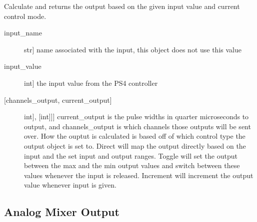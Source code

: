 \documentclass[letterpaper,10pt,english]{sphinxmanual}
\begin{document}
\begin{fulllineitems}
\begin{description}
\end{description}

\begin{fulllineitems}
\label{\detokenize{generic:AnalogOutputObject.AnalogOutputObject.get_output}}
\sphinxAtStartPar
Calculate and returns the output based on the given input value and current control mode.
\begin{description}
\item[{input\_name}] \leavevmode{[}str{]}
\sphinxAtStartPar
name associated with the input, this object does not use this value

\item[{input\_value}] \leavevmode{[}int{]}
\sphinxAtStartPar
the input value from the PS4 controller

\end{description}
\begin{description}
\item[{{[}channels\_output, current\_output{]}}] \leavevmode{[}{[}{[}int{]}, {[}int{]}{]}{]}
\sphinxAtStartPar
current\_output is the pulse widths in quarter microseconds to output, and channels\_output
is which channels those outputs will be sent over. How the ouptut is calculated is based
off of which control type the output object is set to. Direct will map the output directly
based on the input and the set input and output ranges. Toggle will set the output between
the max and the min output values and switch between these values whenever the input is
released. Increment will increment the output value whenever input is given.

\end{description}

\end{fulllineitems}


\end{fulllineitems}



\subsection{Analog Mixer Output}
\label{\detokenize{generic:module-AnalogMixerOutput}}\label{\detokenize{generic:analog-mixer-output}}
\end{document}
